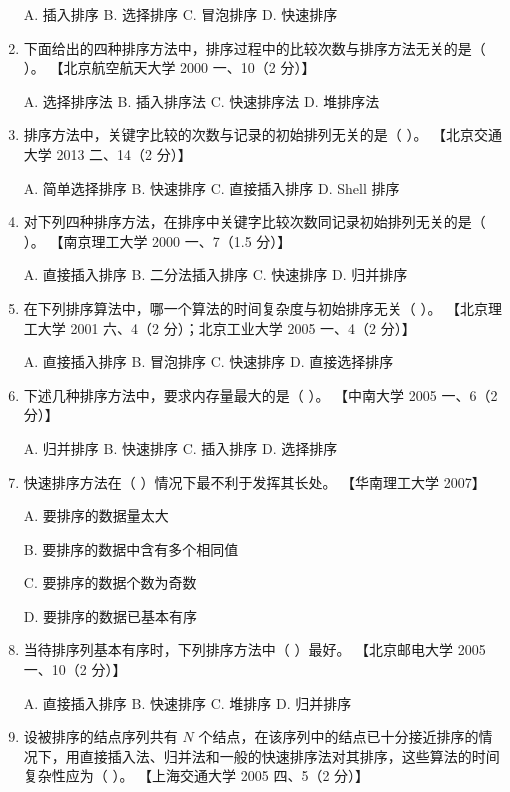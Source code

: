 \documentclass[lang=cn,newtx,10pt,scheme=chinese]{elegantbook}
\begin{document}
\begin{enumerate}
    A. 插入排序 \quad B. 选择排序 \quad C. 冒泡排序 \quad D. 快速排序  

    \item 下面给出的四种排序方法中，排序过程中的比较次数与排序方法无关的是（ ）。  
    【北京航空航天大学 2000 一、10（2 分）】

    A. 选择排序法 \quad B. 插入排序法 \quad C. 快速排序法 \quad D. 堆排序法  

    \item 排序方法中，关键字比较的次数与记录的初始排列无关的是（ ）。  
    【北京交通大学 2013 二、14（2 分）】  

    A. 简单选择排序 \quad B. 快速排序 \quad C. 直接插入排序 \quad D. Shell 排序  

    \item 对下列四种排序方法，在排序中关键字比较次数同记录初始排列无关的是（ ）。  
    【南京理工大学 2000 一、7（1.5 分）】  

    A. 直接插入排序 \quad B. 二分法插入排序 \quad C. 快速排序 \quad D. 归并排序  

    \item 在下列排序算法中，哪一个算法的时间复杂度与初始排序无关（ ）。  
    【北京理工大学 2001 六、4（2 分）；北京工业大学 2005 一、4（2 分）】  

    A. 直接插入排序 \quad B. 冒泡排序 \quad C. 快速排序 \quad D. 直接选择排序  

    \item 下述几种排序方法中，要求内存量最大的是（ ）。  
    【中南大学 2005 一、6（2 分）】

    A. 归并排序 \quad B. 快速排序 \quad C. 插入排序 \quad D. 选择排序  

    \item 快速排序方法在（ ）情况下最不利于发挥其长处。  
    【华南理工大学 2007】  


    A. 要排序的数据量太大
     
    B. 要排序的数据中含有多个相同值  

    C. 要排序的数据个数为奇数  

    D. 要排序的数据已基本有序  

    \item 当待排序列基本有序时，下列排序方法中（ ）最好。  
    【北京邮电大学 2005 一、10（2 分）】  

    A. 直接插入排序 \quad B. 快速排序 \quad C. 堆排序 \quad D. 归并排序 

    \item 设被排序的结点序列共有 $N$ 个结点，在该序列中的结点已十分接近排序的情况下，用直接插入法、归并法和一般的快速排序法对其排序，这些算法的时间复杂性应为（ ）。  
    【上海交通大学 2005 四、5（2 分）】  


\end{enumerate}
\end{document}
